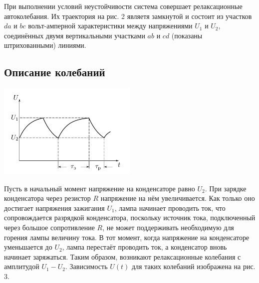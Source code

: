 \documentclass[14pt, a4paper,reqno]{article}
\begin{document}
    При выполнении условий неустойчивости система совершает релаксационные автоколебания. Их траектория
    на рис. 2 являетя замкнутой и состоит из участков $da$ и $bc$ вольт-амперной характеристики между
    напряжениями $U_1$ и $U_2$, соединённых двумя вертикальными участками $ab$ и $cd$ (показаны штрихованными)
    линиями.

    \subsection{Описание колебаний}

    \begin{center}
        \includegraphics[width=0.5\textwidth]{images/picture_3.png}
    \end{center}
    
    Пусть в начальный момент напряжение на конденсаторе равно $U_2$. При зарядке конденсатора через резистор $R$ 
    напряжение на нём увеличивается. Как только оно достигает напряжения зажигания $U_1$, лампа начинает
    проводить ток, что сопровождается разрядкой конденсатора, поскольку источник тока, подключенный
    через большое сопротивление $R$, не может поддерживать необходимую для горения лампы величину тока.
    В тот момент, когда напряжение на конденсаторе уменьшается до $U_2$, лампа перестаёт проводить
    ток, а конденсатор вновь начинает заряжаться. Таким образом, возникают релаксационные колебания
    с амплитудой $U_1 - U_2$. Зависимость $U(t)$ для таких колебаний изображена на рис. 3.
\end{document}
